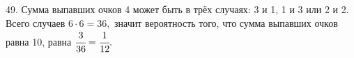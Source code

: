 49. Сумма выпавших очков 4 может быть в трёх случаях: 3 и 1, 1 и 3 или 2 и 2. Всего случаев $6\cdot6=36,$ значит вероятность того, что сумма выпавших очков равна 10, равна $\cfrac{3}{36}=\cfrac{1}{12}.$\\
